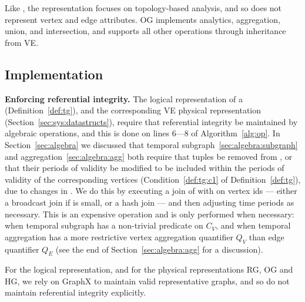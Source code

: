 Like \og, the \hg representation focuses on topology-based analysis,
and so does not represent vertex and edge attributes. OG implements
analytics, aggregation, union, and intersection, and supports all
other operations through inheritance from VE.

\subsection{Implementation}
\label{sec:sys:maint}

{\bf Enforcing referential integrity.}  The \tve logical
representation of a \tg (Definition~\ref{def:tg}), and the
corresponding VE physical representation
(Section~\ref{sec:sys:datastructs}), require that referential
integrity be maintained by algebraic operations, and this is done on
lines 6---8 of Algorithm~\ref{alg:op}.  In Section~\ref{sec:algebra}
we discussed that temporal subgraph~\ref{sec:algebra:subgraph} and
aggregation~\ref{sec:algebra:agg} both require that tuples be removed
from \te, or that their periods of validity be modified to be included
within the periods of validity of the corresponding vertices
(Condition~\ref{def:tg:c1} of Definition~\ref{def:tg}), due to changes
in \tv.  We do this by executing a join of \te with \tv on vertex ids
--- either a broadcast join if \tv is small, or a hash join --- and
then adjusting time periods as necessary.  This is an expensive
operation and is only performed when necessary: when temporal subgraph
has a non-trivial predicate on $C_V$, and when temporal aggregation
has a more restrictive vertex aggregation quantifier $Q_V$ than edge
quantifier $Q_E$ (see the end of Section~\ref{sec:algebra:agg} for a
discussion).

For the \trg logical representation, and for the physical
representations RG, OG and HG, we rely on GraphX to maintain valid
representative graphs, and so do not maintain referential integrity
explicitly.


